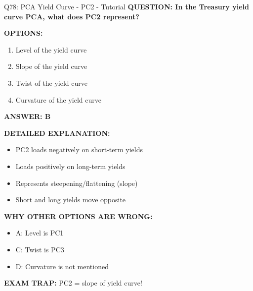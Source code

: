 \documentclass[8pt]{beamer}
\begin{document}
	\begin{frame}{Q78: PCA Yield Curve - PC2 - Tutorial}
		\fontsize{6.5}{7.5}\selectfont
		\textbf{QUESTION: In the Treasury yield curve PCA, what does PC2 represent?}
		
		\vspace{0.1cm}
		\textbf{OPTIONS:}
		\begin{enumerate}
			\item Level of the yield curve
			\item Slope of the yield curve
			\item Twist of the yield curve
			\item Curvature of the yield curve
		\end{enumerate}
		
		\vspace{0.1cm}
		\textcolor{myblue}{\textbf{ANSWER: B}}
		
		\vspace{0.1cm}
		\textbf{DETAILED EXPLANATION:}
		\begin{itemize}
			\item PC2 loads negatively on short-term yields
			\item Loads positively on long-term yields
			\item Represents steepening/flattening (slope)
			\item Short and long yields move opposite
		\end{itemize}
		
		\vspace{0.1cm}
		\textcolor{myred}{\textbf{WHY OTHER OPTIONS ARE WRONG:}}
		\begin{itemize}
			\item \textcolor{myred}{A:} Level is PC1
			\item \textcolor{myred}{C:} Twist is PC3
			\item \textcolor{myred}{D:} Curvature is not mentioned
		\end{itemize}
		
		\textcolor{myred}{\textbf{EXAM TRAP:}} PC2 = \textcolor{myblue}{slope of yield curve}!
	\end{frame}
	
\end{document}
